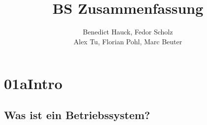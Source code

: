 \documentclass[a4paper]{scrreprt}
\begin{document}
\title{BS Zusammenfassung}
\author{Benedict Hauck, Fedor Scholz\\Alex Tu, Florian Pohl, Marc Beuter}
\maketitle

\tableofcontents
\vspace{1cm}

\chapter{01aIntro}

\section{Was ist ein Betriebssystem?}
\end{document}
